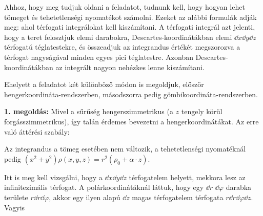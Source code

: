 
\ifdefined\megoldas
 
 Ahhoz, hogy meg tudjuk oldani a feladatot, tudnunk kell, hogy hogyan lehet tömeget és tehetetlenségi nyomatékot számolni. Ezeket az alábbi formulák adják meg:
 ahol térfogati integrálokat kell kiszámítani. A térfogati integrál azt jelenti, hogy a teret felosztjuk elemi darabokra, Descartes-koordinátákban elemi $\dd x\dd y \dd z$ térfogatú téglatestekre, és összeadjuk az integrandus értékét megszorozva a térfogat nagyságával minden egyes pici téglatestre. Azonban Descartes-koordinátákban az integrált nagyon nehézkes lenne kiszámítani.
 
 Ehelyett a feladatot két különböző módon is megoldjuk, először hen\-ger\-ko\-or\-di\-ná\-ta-rend\-szer\-ben, másodszorra pedig gömbikoordináta-rendszerben. 
 
 {\textbf{ 1. megoldás:}} Mivel a sűrűség hengerszimmetrikus (a $z$ tengely körül forgásszimmetrikus), így talán érdemes bevezetni a hengerkoordinátákat. Az erre való áttérési szabály:
 
 Az integrandus a tömeg esetében nem változik, a tehetetlenségi nyomatéknál pedig $(x^2+y^2)\rho(x,y,z)=r^2(\rho_0+\alpha\cdot z)$.
 
 Itt is meg kell vizsgálni, hogy a $\dd x\dd y\dd z$ térfogatelem helyett, mekkora lesz az infinitezimális térfogat. A polárkoordinátáknál láttuk, hogy egy $\dd r$ $\dd\varphi$ darabka területe $r\dd r\dd\varphi$, akkor egy ilyen alapú $\dd z$ magas térfogatelem térfogata $r\dd r\dd\varphi\dd z$. Vagyis
 
